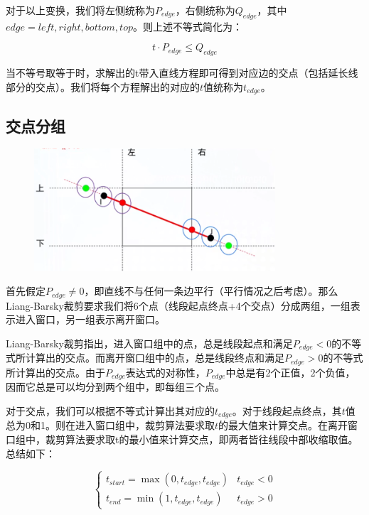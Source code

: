 对于以上变换，我们将左侧统称为$P_{edge}$，右侧统称为$Q_{edge}$，其中$edge=left,right,bottom,top$。则上述不等式简化为：

\begin{equation}
t \cdot P_{edge} \leq Q_{edge}
\end{equation}

当不等号取等于时，求解出的t带入直线方程即可得到对应边的交点（包括延长线部分的交点）。我们将每个方程解出的对应的$t$值统称为$t_{edge}$。

\subsection{交点分组}

\begin{figure}[H]
\centering
\includegraphics[width=0.8\textwidth,keepaspectratio]{imgs/lb-clip-intersection.png}
\end{figure}
 
首先假定$P_{edge} \neq 0$，即直线不与任何一条边平行（平行情况之后考虑）。那么Liang-Barsky裁剪要求我们将6个点（线段起点终点+4个交点）分成两组，一组表示进入窗口，另一组表示离开窗口。

Liang-Barsky裁剪指出，进入窗口组中的点，总是线段起点和满足$P_{edge}<0$的不等式所计算出的交点。而离开窗口组中的点，总是线段终点和满足$P_{edge}>0$的不等式所计算出的交点。由于$P_{edge}$表达式的对称性，$P_{edge}$中总是有2个正值，2个负值，因而它总是可以均分到两个组中，即每组三个点。

对于交点，我们可以根据不等式计算出其对应的$t_{edge}$。对于线段起点终点，其$t$值总为0和1。则在进入窗口组中，裁剪算法要求取$t$的最大值来计算交点。在离开窗口组中，裁剪算法要求取t的最小值来计算交点，即两者皆往线段中部收缩取值。总结如下：

\begin{equation}
\begin{cases}
t_{start} = \max ⁡(0,t_{edge},t_{edge}) & t_{edge}<0 \\
t_{end} = \min ⁡(1,t_{edge},t_{edge}) & t_{edge}>0
\end{cases}
\end{equation}

